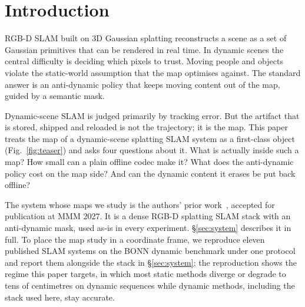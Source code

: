 \documentclass[10pt,twocolumn,letterpaper]{article}
\begin{document}
\section{Introduction}
\label{sec:intro}

RGB-D SLAM built on 3D Gaussian splatting reconstructs a scene as a set of Gaussian
primitives that can be rendered in real time. In dynamic scenes the central difficulty
is deciding which pixels to trust. Moving people and objects violate the static-world assumption
that the map optimises against. The standard answer is an anti-dynamic
policy that keeps moving content out of the map, guided by a semantic mask.

Dynamic-scene SLAM is judged primarily by tracking error. But the artifact that is stored, shipped
and reloaded is not the trajectory; it is the map. This paper treats
the map of a dynamic-scene splatting SLAM system as a first-class object
(Fig.~\ref{fig:teaser}) and asks four
questions about it. What is actually inside such a map? How small can a plain offline
codec make it? What does the anti-dynamic policy cost on the map side? And can the
dynamic content it erases be put back offline?

The system whose maps we study is the authors' prior work~\cite{RoGSSLAM}, accepted for
publication at MMM 2027. It is a dense RGB-D splatting SLAM stack with an anti-dynamic mask,
used as-is in every experiment. \S\ref{sec:system} describes it in full. To place the map study in a
coordinate frame, we reproduce eleven published SLAM systems on the BONN dynamic
benchmark under one protocol and report them alongside the stack in
\S\ref{sec:system}; the reproduction shows the regime this paper targets, in which
most static methods diverge or degrade to tens of centimetres on dynamic sequences while
dynamic methods, including the stack used here, stay accurate.
\end{document}
